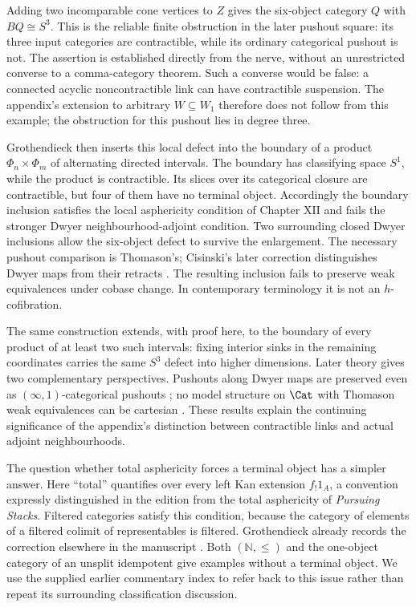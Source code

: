 Adding two incomparable cone vertices to \(Z\) gives the six-object category \(Q\) with \(BQ\cong S^3\). This is the reliable finite obstruction in the later pushout square: its three input categories are contractible, while its ordinary categorical pushout is not. The assertion is established directly from the nerve, without an unrestricted converse to a comma-category theorem. Such a converse would be false: a connected acyclic noncontractible link can have contractible suspension. The appendix's extension to arbitrary \(W\subseteq W_1\) therefore does not follow from this example; the obstruction for this pushout lies in degree three.

Grothendieck then inserts this local defect into the boundary of a product \(\Phi_n\times\Phi_m\) of alternating directed intervals. The boundary has classifying space \(S^1\), while the product is contractible. Its slices over its categorical closure are contractible, but four of them have no terminal object. Accordingly the boundary inclusion satisfies the local asphericity condition of Chapter XII and fails the stronger Dwyer neighbourhood-adjoint condition. Two surrounding closed Dwyer inclusions allow the six-object defect to survive the enlargement. The necessary pushout comparison is Thomason's; Cisinski's later correction distinguishes Dwyer maps from their retracts \citep{Thomason1980,Cisinski1999Dwyer}. The resulting inclusion fails to preserve weak equivalences under cobase change. In contemporary terminology it is not an \(h\)-cofibration.

The same construction extends, with proof here, to the boundary of every product of at least two such intervals: fixing interior sinks in the remaining coordinates carries the same \(S^3\) defect into higher dimensions. Later theory gives two complementary perspectives. Pushouts along Dwyer maps are preserved even as \((\infty,1)\)-categorical pushouts \citep{HackneyOzornovaRiehlRovelli2024}; no model structure on \(\Cat\) with Thomason weak equivalences can be cartesian \citep[Proposition~4.3]{Pavlov2024Thomason}. These results explain the continuing significance of the appendix's distinction between contractible links and actual adjoint neighbourhoods.

The question whether total asphericity forces a terminal object has a simpler answer. Here ``total'' quantifies over every left Kan extension \(f_!1_A\), a convention expressly distinguished in the edition from the total asphericity of \emph{Pursuing Stacks}. Filtered categories satisfy this condition, because the category of elements of a filtered colimit of representables is filtered. Grothendieck already records the correction elsewhere in the manuscript \citep[Chapter II, Corollaries~2.17--2.18]{Grothendieck1990II}. Both \((\mathbb N,\leq)\) and the one-object category of an unsplit idempotent give examples without a terminal object. We use the supplied earlier commentary index to refer back to this issue rather than repeat its surrounding classification discussion.

